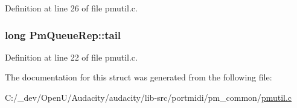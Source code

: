 Definition at line 26 of file pmutil.\+c.

\subsubsection[{\texorpdfstring{tail}{tail}}]{\setlength{\rightskip}{0pt plus 5cm}long Pm\+Queue\+Rep\+::tail}\hypertarget{struct_pm_queue_rep_a86aa2ed3eb0f43260058824bd92c5993}{}\label{struct_pm_queue_rep_a86aa2ed3eb0f43260058824bd92c5993}


Definition at line 22 of file pmutil.\+c.



The documentation for this struct was generated from the following file\+:\begin{DoxyCompactItemize}
\item 
C\+:/\+\_\+dev/\+Open\+U/\+Audacity/audacity/lib-\/src/portmidi/pm\+\_\+common/\hyperlink{pmutil_8c}{pmutil.\+c}\end{DoxyCompactItemize}
